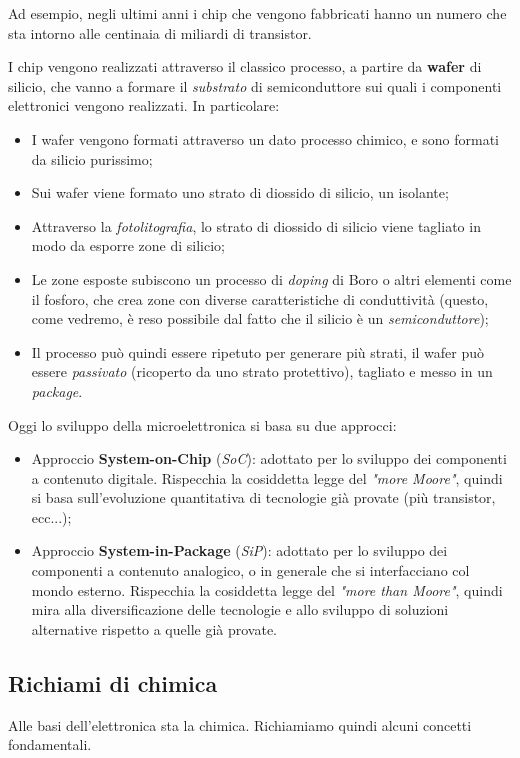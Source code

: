 \documentclass[a4paper,11pt]{article}
\begin{document}
\begin{enumerate}
\begin{itemize}
				Ad esempio, negli ultimi anni i chip che vengono fabbricati hanno un numero che sta intorno alle centinaia di miliardi di transistor.
		\end{itemize}

		I chip vengono realizzati attraverso il classico processo, a partire da \textbf{wafer} di silicio, che vanno a formare il \textit{substrato} di semiconduttore sui quali i componenti elettronici vengono realizzati. In particolare:
		\begin{itemize}
			\item I wafer vengono formati attraverso un dato processo chimico, e sono formati da silicio purissimo;
			\item Sui wafer viene formato uno strato di diossido di silicio, un isolante;
			\item Attraverso la \textit{fotolitografia}, lo strato di diossido di silicio viene tagliato in modo da esporre zone di silicio;
			\item Le zone esposte subiscono un processo di \textit{doping} di Boro o altri elementi come il fosforo, che crea zone con diverse caratteristiche di conduttività (questo, come vedremo, è reso possibile dal fatto che il silicio è un \textit{semiconduttore});
			\item Il processo può quindi essere ripetuto per generare più strati, il wafer può essere \textit{passivato} (ricoperto da uno strato protettivo), tagliato e messo in un \textit{package}. 
		\end{itemize}

		Oggi lo sviluppo della microelettronica si basa su due approcci:
		\begin{itemize}
			\item Approccio \textbf{System-on-Chip} (\textit{SoC}): adottato per lo sviluppo dei componenti a contenuto digitale. Rispecchia la cosiddetta legge del \textit{"more Moore"}, quindi si basa sull'evoluzione quantitativa di tecnologie già provate (più transistor, ecc...);
			\item Approccio \textbf{System-in-Package} (\textit{SiP}): adottato per lo sviluppo dei componenti a contenuto analogico, o in generale che si interfacciano col mondo esterno. Rispecchia la cosiddetta legge del \textit{"more than Moore"}, quindi mira alla diversificazione delle tecnologie e allo sviluppo di soluzioni alternative rispetto a quelle già provate.
		\end{itemize}
\end{enumerate}

\subsection{Richiami di chimica}
Alle basi dell'elettronica sta la chimica. Richiamiamo quindi alcuni concetti fondamentali.
\end{document}
